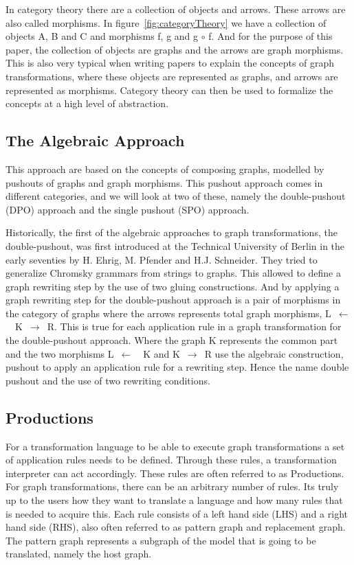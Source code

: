 In category theory there are a collection of objects and arrows. These arrows
are also called morphisms. In figure~\ref{fig:categoryTheory} we have a
collection of objects A, B and C and morphisms f, g and g $\circ$ f. And for the
purpose of this paper, the collection of objects are graphs and the arrows are
graph morphisms. This is also very typical when writing papers to explain the
concepts of graph transformations, where these objects are represented as
graphs, and arrows are represented as morphisms. Category theory can then be
used to formalize the concepts at a high level of abstraction.

\subsection{The Algebraic Approach}
\noindent This approach are based on the concepts of composing graphs, modelled
by pushouts of graphs and graph morphisms. This pushout approach comes in
different categories, and we will look at two of these, namely the
double-pushout (DPO) approach and the single pushout (SPO) approach\cite{Loewe1997,Ehrig1997}.

\indent Historically, the first of the algebraic approaches to graph
transformations, the double-pushout, was first introduced at the Technical
University of Berlin in the early seventies by H. Ehrig, M. Pfender and H.J.
Schneider\cite{INSPEC:606170}. They tried to generalize Chromsky grammars from
strings to graphs. This allowed to define a graph rewriting step by the use of
two gluing constructions. And by applying a graph rewriting step for the
double-pushout approach is a pair of morphisms in the category of graphs where
the arrows represents total graph morphisms, \linebreak\mbox{L $\longleftarrow$
\ K $\longrightarrow$ R}. This is true for each application rule in a graph
transformation for the double-pushout approach. Where the graph K represents the
common part and the two morphisms \mbox{L $\longleftarrow$ \ K} and \mbox{K
$\longrightarrow$ R} use the algebraic construction, pushout to apply an
application rule for a rewriting step. Hence the name double pushout and the use
of two rewriting conditions.

\subsection{Productions}
\noindent For a transformation language to be able to execute graph
transformations a set of application rules needs to be defined. Through these
rules, a transformation interpreter can act accordingly. These rules are often
referred to as Productions. For graph transformations, there can be an arbitrary
number of rules. Its truly up to the users how they want to translate a
language and how many rules that is needed to acquire this. Each rule consists
of a left hand side (LHS) and a right hand side (RHS), also often referred to as
pattern graph and replacement graph. The pattern graph represents a subgraph of
the model that is going to be translated, namely the host graph.


